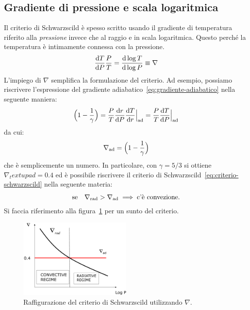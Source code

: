 \subsection{Gradiente di pressione e scala logaritmica}
Il criterio di Schwarzscild è spesso scritto usando il gradiente di temperatura riferito alla \emph{pressione} invece che al raggio e in scala logaritmica. Questo perché la temperatura è intimamente connessa con la pressione.
\begin{equation}
    \dfrac{\mathop{}\!\mathrm{d} T}{\mathop{}\!\mathrm{d} P} \dfrac{P}{T} = \dfrac{\mathop{}\!\mathrm{d} \log T}{\mathop{}\!\mathrm{d} \log P} \equiv \nabla
\end{equation}
L'impiego di $\nabla$ semplifica la formulazione del criterio. Ad esempio, possiamo riscrivere l'espressione del gradiente adiabatico~\eqref{eq:gradiente-adiabatico} nella seguente maniera:
\[
\Bigl(1- \frac{1}{\gamma}\Bigr) = \dfrac{P}{T} \dfrac{\mathop{}\!\mathrm{d} r}{\mathop{}\!\mathrm{d} P} \dfrac{\mathop{}\!\mathrm{d} T}{\mathop{}\!\mathrm{d} r}\Big|_\textup{ad} = \dfrac{P}{T} \dfrac{\mathop{}\!\mathrm{d} T}{\mathop{}\!\mathrm{d} P}\Big|_\textup{ad}
\]
da cui:
\begin{equation}
    \nabla_\textup{ad} = \Bigl(1- \frac{1}{\gamma}\Bigr)
\end{equation}
che è semplicemente un numero. In particolare, con $\gamma = 5/3$ si ottiene $\nabla_textup{ad} = 0.4$ ed è possibile riscrivere il criterio di Schwarzscild~\eqref{eq:criterio-schwarzscild} nella seguente materia:
\begin{equation}\label{eq:criterio-schwarzscild-nabla}
    \text{se} \quad \nabla_\textup{rad} > \nabla_\textup{ad} \implies \text{c'è convezione.}
\end{equation}
Si faccia riferimento alla figura~\ref{fig:criterio-schwarzscild-nabla} per un sunto del criterio.

\begin{figure}
\centering
\includegraphics[width=0.5\textwidth]{immagini/criterio-schwarzscild-nabla.png}
\caption{Raffigurazione del criterio di Schwarzscild utilizzando $\nabla$.}
\label{fig:criterio-schwarzscild-nabla}
\end{figure}